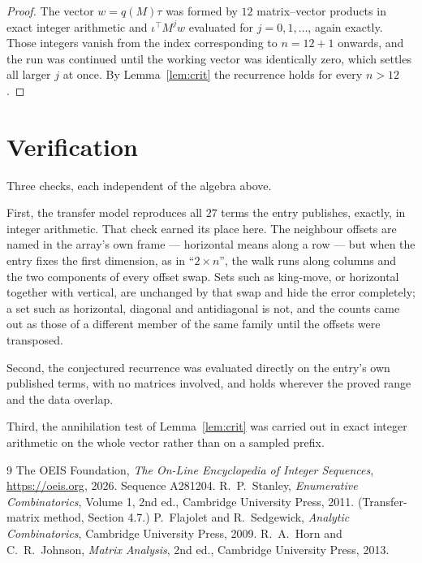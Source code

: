 \documentclass[11pt,a4paper]{article}
\theoremstyle{plain}
\theoremstyle{definition}
\begin{document}
\begin{proof}
The vector $w=q(M)\tau$ was formed by $12$ matrix--vector products in exact integer
arithmetic and $\iota^{\!\top}M^{j}w$ evaluated for $j=0,1,\dots$, again exactly. Those
integers vanish from the index corresponding to $n=12+1$ onwards, and the run was
continued until the working vector was identically zero, which settles all larger $j$ at once.
By Lemma~\ref{lem:crit} the recurrence holds for every $n>12$.
\end{proof}

\section{Verification}

Three checks, each independent of the algebra above.

First, the transfer model reproduces all $27$ terms the entry publishes, exactly, in
integer arithmetic. That check earned its place here. The neighbour offsets are named in the
array's own frame --- horizontal means along a row --- but when the entry fixes the first
dimension, as in ``$2\times n$'', the walk runs along columns and the two components of every
offset swap. Sets such as king-move, or horizontal together with vertical, are unchanged by
that swap and hide the error completely; a set such as horizontal, diagonal and antidiagonal
is not, and the counts came out as those of a different member of the same family until the
offsets were transposed.

Second, the conjectured recurrence was evaluated directly on the entry's own published terms,
with no matrices involved, and holds wherever the proved range and the data overlap.

Third, the annihilation test of Lemma~\ref{lem:crit} was carried out in exact integer
arithmetic on the whole vector rather than on a sampled prefix.

\begin{thebibliography}{9}
 The OEIS Foundation, \emph{The On-Line Encyclopedia of Integer
Sequences}, \url{https://oeis.org}, 2026. Sequence A281204.
 R.~P.~Stanley, \emph{Enumerative Combinatorics}, Volume 1, 2nd ed.,
Cambridge University Press, 2011. (Transfer-matrix method, Section 4.7.)
 P.~Flajolet and R.~Sedgewick, \emph{Analytic Combinatorics}, Cambridge
University Press, 2009.
 R.~A.~Horn and C.~R.~Johnson, \emph{Matrix Analysis}, 2nd ed., Cambridge
University Press, 2013.
\end{thebibliography}
\end{document}
